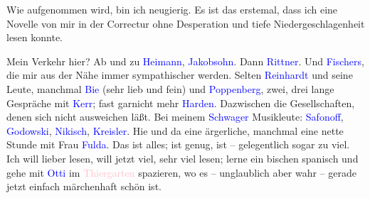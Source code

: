 \pstart
           Wie \label{K_L03422-6v}\label{K_L03422-6h} aufgenommen wird, bin ich
               neugierig. Es ist das erstemal, dass ich eine Novelle von mir in der Correctur ohne
               Desperation und tiefe Niedergeschlagenheit lesen konnte.\pend
           
\pstart
           Mein Verkehr hier? Ab und zu \textcolor{blue}{Heimann}{}\ledrightnote{\textcolor{blue}{Moritz Heimann}}, \textcolor{blue}{Jakobsohn}{}\ledrightnote{\textcolor{blue}{Siegfried Jacobsohn}}. Dann \textcolor{blue}{Rittner}{}\ledrightnote{\textcolor{blue}{Rudolf Rittner}}. Und \textcolor{blue}{Fischers}{}\ledrightnote{\textcolor{blue}{Hedwig Fischer}{\newline}\textcolor{blue}{Samuel Fischer}}, die mir aus der Nähe immer sympathischer werden. Selten \textcolor{blue}{Reinhardt}{}\ledrightnote{\textcolor{blue}{Max Reinhardt}} und seine Leute, manchmal \textcolor{blue}{Bie}{}\ledrightnote{\textcolor{blue}{Oskar Bie}} (sehr lieb und fein) und \textcolor{blue}{Poppenberg}{}\ledrightnote{\textcolor{blue}{Felix Poppenberg}}, zwei, drei lange Gespräche mit \textcolor{blue}{Kerr}{}\ledrightnote{\textcolor{blue}{Alfred Kerr}}; fast garnicht mehr \textcolor{blue}{Harden}{}\ledrightnote{\textcolor{blue}{Maximilian Harden}}. Dazwischen die Gesellschaften, denen sich nicht ausweichen läßt. Bei
               meinem \textcolor{blue}{Schwager}{}\ledrightnote{{$\rightarrow$}\textcolor{blue}{Richard Metzl}} Musikleute:
                  \textcolor{blue}{Safonoff}{}\ledrightnote{\textcolor{blue}{Vasilij Ilʹič Safonov}}, \textcolor{blue}{Godowski}{}\ledrightnote{\textcolor{blue}{Leopold Godowsky}}, \textcolor{blue}{Nikisch}{}\ledrightnote{\textcolor{blue}{Arthur Nikisch}}, \textcolor{blue}{Kreisler}{}\ledrightnote{\textcolor{blue}{Fritz Kreisler}}. Hie und da eine ärgerliche, manchmal eine nette
               Stunde mit Frau \textcolor{blue}{Fulda}{}\ledrightnote{\textcolor{blue}{Ida d’Albert}}. Das ist alles; ist
               genug, ist – gelegentlich sogar zu viel. Ich will lieber lesen, will jetzt viel, sehr
               viel lesen; lerne ein bischen spanisch und gehe mit \textcolor{blue}{Otti}{}\ledrightnote{\textcolor{blue}{Ottilie Salten}} im \textcolor{pink}{Thiergarten}{}\ledrightnote{\textcolor{pink}{Tiergarten}} spazieren, wo es –
               unglaublich aber wahr – gerade jetzt einfach märchenhaft schön ist.\pend
           
